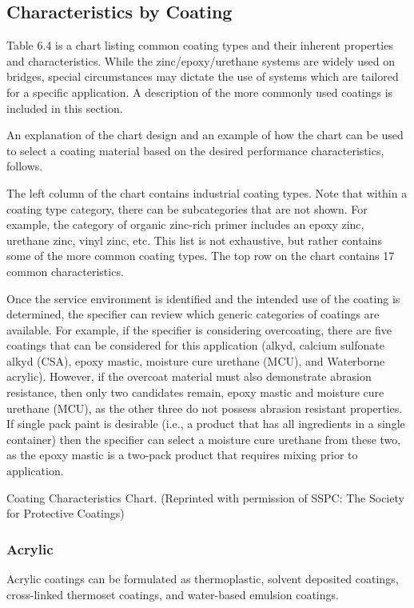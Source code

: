 \subsection{Characteristics by Coating}
Table 6.4 is a chart listing common coating types and their inherent properties and characteristics. While the
zinc/epoxy/urethane systems are widely used on bridges, special circumstances may dictate the use of systems which
are tailored for a specific application. A description of the more commonly used coatings is included in this section.


An explanation of the chart design and an example of how the chart can be used to select a coating material
based on the desired performance characteristics, follows.

The left column of the chart contains industrial coating types. Note that within a coating type category, there can
be subcategories that are not shown. For example, the category of organic zinc-rich primer includes an epoxy zinc,
urethane zinc, vinyl zinc, etc. This list is not exhaustive, but rather contains some of the more common coating types.
The top row on the chart contains 17 common characteristics.

Once the service environment is identified and the intended use of the coating is determined, the specifier can
review which generic categories of coatings are available. For example, if the specifier is considering overcoating,
there are five coatings that can be considered for this application (alkyd, calcium sulfonate alkyd (CSA), epoxy
mastic, moisture cure urethane (MCU), and Waterborne acrylic). However, if the overcoat material must also
demonstrate abrasion resistance, then only two candidates remain, epoxy mastic and moisture cure urethane (MCU),
as the other three do not possess abrasion resistant properties. If single pack paint is desirable (i.e., a product that has
all ingredients in a single container) then the specifier can select a moisture cure urethane from these two, as the
epoxy mastic is a two-pack product that requires mixing prior to application.

\begin{table}
  \caption{Coating Characteristics Chart. (Reprinted with permission of SSPC: The Society for Protective Coatings)}
  \label{tab:coating-characteristics}
\end{table}


\subsubsection{Acrylic}
Acrylic coatings can be formulated as thermoplastic, solvent deposited coatings, cross-linked thermoset coatings,
and water-based emulsion coatings.

